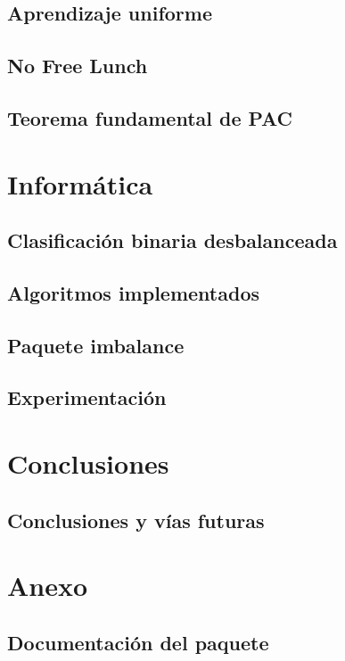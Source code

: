 \documentclass[oneside,openany,titlepage,dottedtoc,headinclude,%
               footinclude=true,cleardoublepage=empty,abstractoff, %
               paper=a4,fontsize=11pt,%
               ]{scrreprt}
\begin{document}
  \chapter{Aprendizaje uniforme}
    
  \chapter{No Free Lunch}
    
  \chapter{Teorema fundamental de PAC}
    
  
\part{Informática}
  \chapter{Clasificación binaria desbalanceada}
    
  \chapter{Algoritmos implementados}
    
    
    
    
    
  \chapter{Paquete imbalance}
    
  \chapter{Experimentación}
    

\part{Conclusiones}
\chapter{Conclusiones y vías futuras}
 
\appendix
\part*{Anexo}
  \chapter{Documentación del paquete}
    


\end{document}
